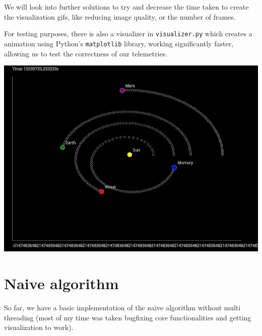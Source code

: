 \documentclass{article}
\begin{document}
We will look into further solutions to try and decrease the time taken to create the visualization gifs, like reducing image quality, or the number of frames. 

For testing purposes, there is also a visualizer in \texttt{visualizer.py} which creates a animation using Python's \texttt{matplotlib} library, working significantly faster, allowing us to test the correctness of our telemetries.

\begin{center}
    \includegraphics[scale=0.5]{screenshot.jpg}
\end{center}

\section{Naive algorithm}

So far, we have a basic implementation of the naive algorithm without multi threading (most of my time was taken bugfixing core functionalities and getting visualization to work). 
\end{document}
